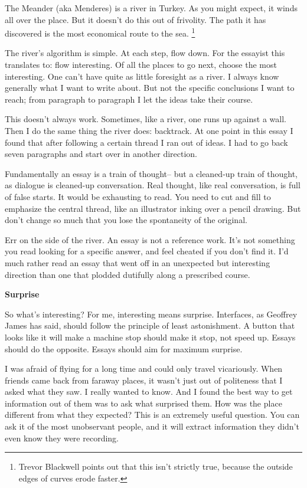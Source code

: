 \documentclass[12pt]{book}
\begin{document}
The Meander (aka Menderes) is a river in Turkey. As you might expect, it
winds all over the place. But it doesn't do this out of frivolity. The
path it has discovered is the most economical route to the sea. \footnote{Trevor Blackwell points out that this isn't strictly true,
because the outside edges of curves erode faster.}

The river's algorithm is simple. At each step, flow down. For the
essayist this translates to: flow interesting. Of all the places to go
next, choose the most interesting. One can't have quite as little
foresight as a river. I always know generally what I want to write
about. But not the specific conclusions I want to reach; from paragraph
to paragraph I let the ideas take their course.

This doesn't always work. Sometimes, like a river, one runs up against a
wall. Then I do the same thing the river does: backtrack. At one point
in this essay I found that after following a certain thread I ran out of
ideas. I had to go back seven paragraphs and start over in another
direction.

Fundamentally an essay is a train of thought-- but a cleaned-up train of
thought, as dialogue is cleaned-up conversation. Real thought, like real
conversation, is full of false starts. It would be exhausting to read.
You need to cut and fill to emphasize the central thread, like an
illustrator inking over a pencil drawing. But don't change so much that
you lose the spontaneity of the original.

Err on the side of the river. An essay is not a reference work. It's not
something you read looking for a specific answer, and feel cheated if
you don't find it. I'd much rather read an essay that went off in an
unexpected but interesting direction than one that plodded dutifully
along a prescribed course.

\textbf{Surprise}

So what's interesting? For me, interesting means surprise. Interfaces,
as Geoffrey James has said, should follow the principle of least
astonishment. A button that looks like it will make a machine stop
should make it stop, not speed up. Essays should do the opposite. Essays
should aim for maximum surprise.

I was afraid of flying for a long time and could only travel
vicariously. When friends came back from faraway places, it wasn't just
out of politeness that I asked what they saw. I really wanted to know.
And I found the best way to get information out of them was to ask what
surprised them. How was the place different from what they expected?
This is an extremely useful question. You can ask it of the most
unobservant people, and it will extract information they didn't even
know they were recording.
\end{document}
